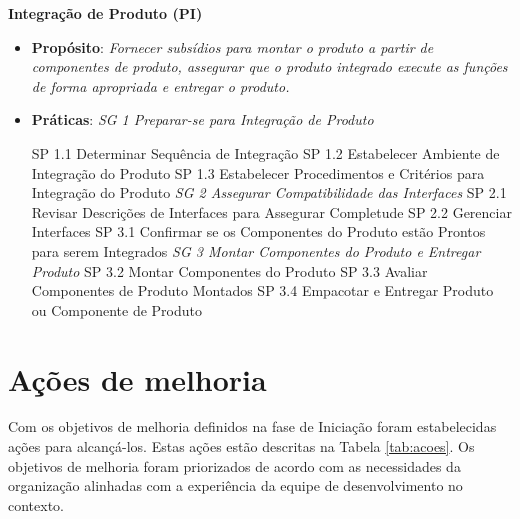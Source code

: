 \noindent
\textbf{Integração de Produto (PI)}
\begin{itemize}
    \item \textbf{Propósito}: \emph{Fornecer
subsídios para montar o produto a partir de componentes de produto,
assegurar que o produto integrado execute as funções de forma
apropriada e entregar o produto. \cite{cmmi}}
    \item \textbf{Práticas}:
		\subitem \textit{SG 1 Preparar-se para Integração de Produto}

			\subsubitem SP 1.1 Determinar Sequência de Integração
			\subsubitem SP 1.2 Estabelecer Ambiente de Integração do Produto
			\subsubitem SP 1.3 Estabelecer Procedimentos e Critérios para Integração do Produto
		\subitem \textit{SG 2 Assegurar Compatibilidade das Interfaces}
			\subsubitem SP 2.1 Revisar Descrições de Interfaces para Assegurar Completude
			\subsubitem SP 2.2 Gerenciar Interfaces
			\subsubitem SP 3.1 Confirmar se os Componentes do Produto estão Prontos para serem Integrados
		\subitem \textit{SG 3 Montar Componentes do Produto e Entregar Produto}
			\subsubitem SP 3.2 Montar Componentes do Produto
			\subsubitem SP 3.3 Avaliar Componentes de Produto Montados
			\subsubitem SP 3.4 Empacotar e Entregar Produto ou Componente de Produto
\end{itemize}


\vfill
\pagebreak
\section{Ações de melhoria}

Com os objetivos de melhoria definidos na fase de Iniciação foram estabelecidas ações para alcançá-los. Estas ações estão 
descritas na Tabela \ref{tab:acoes}. Os objetivos de melhoria foram priorizados de acordo com as necessidades da organização
alinhadas com a experiência da equipe de desenvolvimento no contexto.

